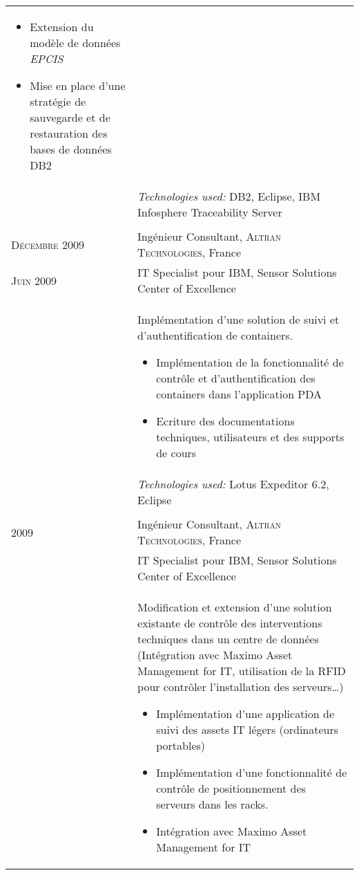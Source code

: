 \begin{longtable}{R{2.5cm}|p{14.8cm}}
{ 		\begin{itemize}
			\item Extension du modèle de données \emph{EPCIS}
			\item Mise en place d'une stratégie de sauvegarde et de restauration des bases de données DB2
		\end{itemize}
		\vspace{-1em}
 	}\\&
 	\footnotesize{\emph{Technologies used:} DB2, Eclipse, IBM Infosphere Traceability Server }\\
  \\
 	\textsc{Décembre 2009} & Ingénieur Consultant, \textsc{Altran Technologies}, France\\
 	\textsc{Juin 2009}& IT Specialist pour IBM, Sensor Solutions Center of Excellence\\&
 	\footnotesize{
 	 	Implémentation d'une solution de suivi et d'authentification de containers. 
 		\begin{itemize}
 		  	\item Implémentation de la fonctionnalité de contrôle et d'authentification des containers dans l'application PDA
			\item Ecriture des documentations techniques, utilisateurs et des supports de cours
		\end{itemize}
		\vspace{-1em}
 	}\\&
 \footnotesize{\emph{Technologies used:} Lotus Expeditor 6.2, Eclipse }\\ 	
   \\
 	\textsc{2009} & Ingénieur Consultant, \textsc{Altran Technologies}, France\\
 	& IT Specialist pour IBM, Sensor Solutions Center of Excellence\\&
 	\footnotesize{
 	 	Modification et extension d'une solution existante de contrôle des interventions techniques dans un centre de données 
 	 	(Intégration avec Maximo Asset Management for IT, utilisation de la RFID pour contrôler l'installation des serveurs\ldots)
 		\begin{itemize}
 		  	\item Implémentation d'une application de suivi des assets IT légers (ordinateurs portables)
 		  	\item Implémentation d'une fonctionnalité de contrôle de positionnement des serveurs dans les racks.
 		  	\item Intégration avec Maximo Asset Management for IT

\end{itemize}}
\end{longtable}
